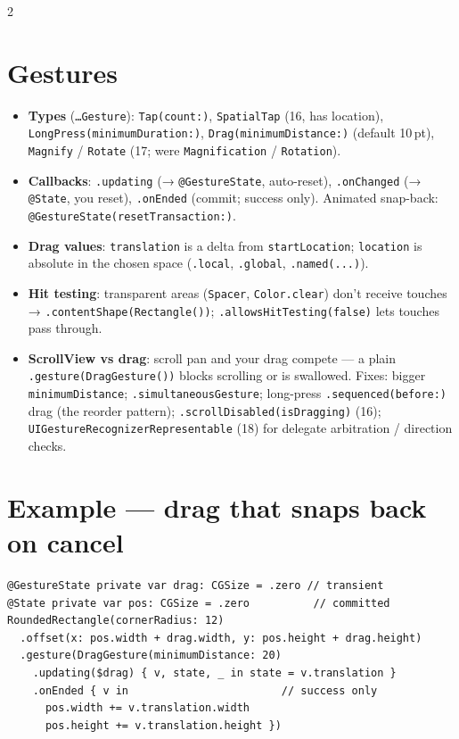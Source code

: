 \documentclass[8pt]{extarticle}
\begin{document}
\begin{multicols}{2}
\raggedright

\section{Gestures}
\begin{itemize}
  \item \textbf{Types} (\texttt{…Gesture}): \texttt{Tap(count:)}, \texttt{SpatialTap} (16, has location),
        \texttt{LongPress(minimumDuration:)}, \texttt{Drag(minimumDistance:)} (default 10\,pt),
        \texttt{Magnify} / \texttt{Rotate} (17; were \texttt{Magnification} / \texttt{Rotation}).
  \item \textbf{Callbacks}: \texttt{.updating} (→ \texttt{@GestureState}, auto-reset), \texttt{.onChanged}
        (→ \texttt{@State}, you reset), \texttt{.onEnded} (commit; success only). Animated snap-back:
        \texttt{@GestureState(resetTransaction:)}.
  \item \textbf{Drag values}: \texttt{translation} is a delta from \texttt{startLocation}; \texttt{location} is absolute in
        the chosen space (\texttt{.local}, \texttt{.global}, \texttt{.named(...)}).
  \item \textbf{Hit testing}: transparent areas (\texttt{Spacer}, \texttt{Color.clear}) don't receive touches →
        \texttt{.contentShape(Rectangle())}; \texttt{.allowsHitTesting(false)} lets touches pass through.
  \item \textbf{ScrollView vs drag}: scroll pan and your drag compete — a plain \texttt{.gesture(DragGesture())}
        blocks scrolling or is swallowed. Fixes: bigger \texttt{minimumDistance}; \texttt{.simultaneousGesture};
        long-press \texttt{.sequenced(before:)} drag (the reorder pattern); \texttt{.scrollDisabled(isDragging)} (16);
        \texttt{UIGestureRecognizerRepresentable} (18) for delegate arbitration / direction checks.
\end{itemize}

\section{Example — drag that snaps back on cancel}
\begin{lstlisting}[language=SwiftSheet]
@GestureState private var drag: CGSize = .zero // transient
@State private var pos: CGSize = .zero          // committed
RoundedRectangle(cornerRadius: 12)
  .offset(x: pos.width + drag.width, y: pos.height + drag.height)
  .gesture(DragGesture(minimumDistance: 20)
    .updating($drag) { v, state, _ in state = v.translation }
    .onEnded { v in                        // success only
      pos.width += v.translation.width
      pos.height += v.translation.height })
\end{lstlisting}


\end{multicols}
\end{document}

